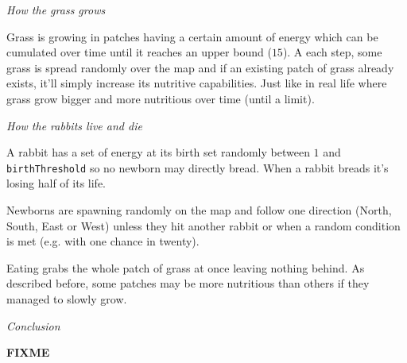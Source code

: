 \documentclass[10pt,a4paper]{article}
\begin{document}
\newpage
\medskip
\emph{How the grass grows}

Grass is growing in patches having a certain amount of energy which can be
cumulated over time until it reaches an upper bound ($15$). A each step, some
grass is spread randomly over the map and if an existing patch of grass already
exists, it'll simply increase its nutritive capabilities. Just like in real
life where grass grow bigger and more nutritious over time (until a limit).

\medskip
\emph{How the rabbits live and die}

A rabbit has a set of energy at its birth set randomly between $1$ and
\texttt{birthThreshold} so no newborn may directly bread. When a rabbit breads
it's losing half of its life.

Newborns are spawning randomly on the map and follow one direction (North,
South, East or West) unless they hit another rabbit or when a random condition
is met (e.g. with one chance in twenty).

Eating grabs the whole patch of grass at once leaving nothing behind. As
described before, some patches may be more nutritious than others if they
managed to slowly grow.

\medskip
\emph{Conclusion}

\textbf{FIXME}
\end{document}
